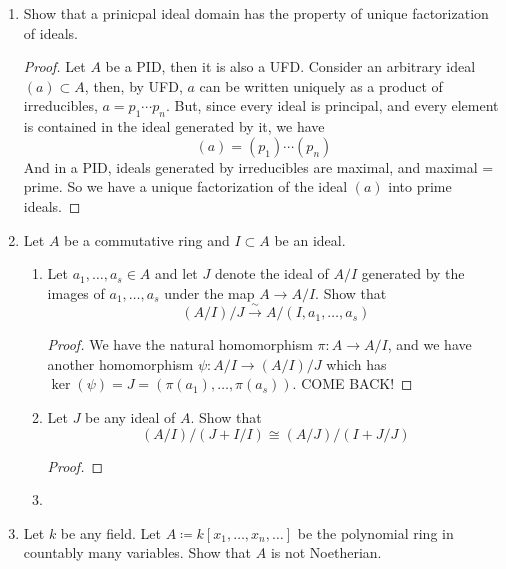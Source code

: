 \documentclass[hidelinks,12pt]{article}
\begin{document}
\begin{enumerate}
\begin{proof}
        \end{proof}
    \item Show that a prinicpal ideal domain has the property of unique factorization of ideals.
        \begin{proof}
        Let \(A\) be a PID, then it is also a UFD. Consider an arbitrary ideal \((a)\subset A\), then, by UFD, \(a\) can be written uniquely as a product of irreducibles, \(a=p_{1}\cdots p_{n}\). But, since every ideal is principal, and every element is contained in the ideal generated by it, we have \[
            (a)=(p_{1})\cdots(p_{n})
        \]
        And in a PID, ideals generated by irreducibles are maximal, and maximal = prime. So we have a unique factorization of the ideal \((a)\) into prime ideals. 
        \end{proof}
    \item Let \(A\) be a commutative ring and \(I\subset A\) be an ideal.
        \begin{enumerate}[label=(\alph*).]
            \item Let \(a_{1},\dots,a_{s}\in A\) and let \(J\) denote the ideal of \(A/I\) generated by the images of \(a_{1},\dots,a_{s}\) under the map \(A\to A/I\). Show that \[
                    (A/I)/J\overset{\sim}{\to} A/(I,a_{1},\dots,a_{s})
            \]
            \begin{proof}
           We have the natural homomorphism \(\pi:A\to A/I\), and we have another homomorphism \(\psi:A/I\to (A/I)/J\) which has \(\ker(\psi)=J=(\pi(a_{1}),\dots,\pi(a_{s}))\). COME BACK!
            \end{proof}
            \item Let \(J\) be any ideal of \(A\). Show that \[
                    (A/I)/(J+I/I)\cong(A/J)/(I+J/J)
            \]
           \begin{proof}
           
           \end{proof} 
            \item 
        \end{enumerate}
    \item Let \(k\) be any field. Let \(A\coloneqq k[x_{1},\dots,x_{n},\dots]\) be the polynomial ring in countably many variables. Show that \(A\) is not Noetherian.
\end{enumerate}
\end{document}
